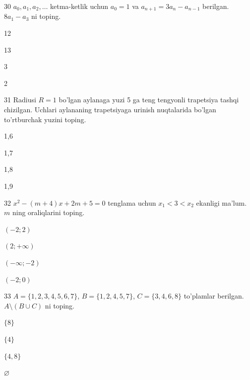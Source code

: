 \documentclass[14pt]{article}
\begin{document}
\begin{questionbox}{30}
    \(a_0, a_1, a_2, \dots\) ketma-ketlik uchun \(a_0 = 1\) va \(a_{n+1} = 3a_n-a_{n-1}\) berilgan. \(8a_1 -a_{3}\) ni toping.
    \begin{options}
        \item 12
        \item 13
        \item 3
        \item 2
    \end{options}
\end{questionbox}

\begin{questionbox}{31}
    Radiusi \(R=1\) bo'lgan aylanaga yuzi 5 ga teng tengyonli trapetsiya tashqi chizilgan. Uchlari aylananing trapetsiyaga urinish nuqtalarida bo'lgan to'rtburchak yuzini toping.
    \begin{options}
        \item 1,6
        \item 1,7
        \item 1,8
        \item 1,9
    \end{options}
\end{questionbox}

\begin{questionbox}{32}
    \(x^2 - (m+4)x + 2m + 5 = 0\) tenglama uchun \(x_1 < 3 < x_2\) ekanligi ma'lum. \(m\) ning oraliqlarini toping.
    \begin{options}
        \item \((-2; 2)\)
        \item \((2; +\infty)\)
        \item \((-\infty; -2)\)
        \item \((-2; 0)\)
    \end{options}
\end{questionbox}

\begin{questionbox}{33}
    \(A = \{1,2,3,4,5,6,7\}\), \(B = \{1,2,4,5,7\}\), \(C = \{3,4,6,8\}\) to'plamlar berilgan. \(A \setminus (B \cup C)\) ni toping.
    \begin{options}
        \item \(\{8\}\)
        \item \(\{4\}\)
        \item \(\{4,8\}\)
        \item \(\varnothing\)
    \end{options}
\end{questionbox}
\end{document}

